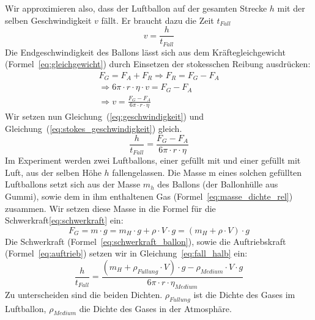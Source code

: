 \documentclass{article}
\begin{document}
      Wir approximieren also, dass der Luftballon auf der gesamten Strecke \(h\) mit der selben Geschwindigkeit \(v\) fällt. Er braucht dazu die Zeit \(t_{Fall}\)
      \begin{equation} \label{eq:geschwindigkeit}
          v = \frac{h}{t_{Fall}}
      \end{equation}
      Die Endgeschwindigkeit des Ballons lässt sich aus dem Kräftegleichgewicht (Formel~\ref{eq:gleichgewicht}) durch Einsetzen der stokesschen Reibung ausdrücken:
      \begin{equation}
          \begin{gathered} \label{eq:stokes_geschwindigkeit}
              F_G = F_A + F_R \Rightarrow F_R = F_G - F_A \\
              \Rightarrow 6 \pi \cdot r \cdot \eta \cdot v = F_G - F_A \\
              \Rightarrow v = \frac{ F_G - F_A }{ 6 \pi \cdot r \cdot \eta }
          \end{gathered}
      \end{equation}
      Wir setzen nun Gleichung~(\ref{eq:geschwindigkeit}) und Gleichung~(\ref{eq:stokes_geschwindigkeit}) gleich.
      \begin{equation} \label{eq:fall_halb}
          \frac{h}{t_{Fall}} = \frac{ F_G - F_A }{ 6 \pi \cdot r \cdot \eta }
      \end{equation}
      Im Experiment werden zwei Luftballons, einer gefüllt mit  und einer gefüllt mit Luft, aus der selben Höhe \(h\) fallengelassen.
      Die Masse m eines solchen gefüllten Luftballons setzt sich aus der Masse \( m_h \) des Ballons (der Ballonhülle aus Gummi), sowie dem in ihm enthaltenen Gas (Formel~\ref{eq:masse_dichte_rel}) zusammen.
      Wir setzen diese Masse in die Formel für die Schwerkraft\ref{eq:schwerkraft} ein:
      \begin{equation} \label{eq:schwerkraft_ballon}
          F_G = m \cdot g = m_H \cdot g + \rho \cdot V \cdot g = \left( m_H + \rho \cdot V \right) \cdot g
      \end{equation}
      Die Schwerkraft (Formel~\ref{eq:schwerkraft_ballon}), sowie die Auftriebskraft (Formel~\ref{eq:auftrieb}) setzen wir in Gleichung~\ref{eq:fall_halb} ein:
      \begin{equation} \label{eq:fall}
          \frac{h}{t_{Fall}} = \frac{ \left( m_H + \rho_{F\ddot{u}llung} \cdot V \right) \cdot g - \rho_{Medium} \cdot V \cdot g }{ 6 \pi \cdot r \cdot \eta_{Medium} }
      \end{equation}
      Zu unterscheiden sind die beiden Dichten. \(\rho_{F\ddot{u}llung}\) ist die Dichte des Gases im Luftballon, \(\rho_{Medium}\) die Dichte des Gases in der Atmosphäre.
\end{document}

